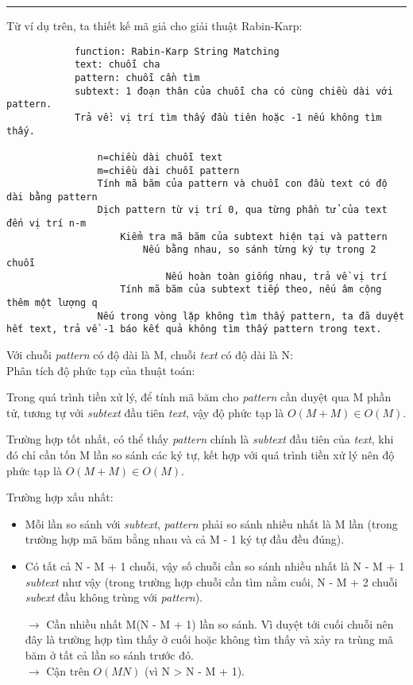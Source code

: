 \documentclass[a4paper,11pt]{article}
\begin{document}
\begin{enumerate}
		\vspace*{2mm}
		\hrule
		\vspace*{4mm}
		Từ ví dụ trên, ta thiết kế mã giả cho giải thuật Rabin-Karp:

			\begin{lstlisting}
			function: Rabin-Karp String Matching
			text: chuỗi cha 
			pattern: chuỗi cần tìm 
			subtext: 1 đoạn thân của chuỗi cha có cùng chiều dài với pattern.
			Trả về: vị trí tìm thấy đầu tiên hoặc -1 nếu không tìm thấy.
			
				n=chiều dài chuỗi text
				m=chiều dài chuỗi pattern
				Tính mã băm của pattern và chuỗi con đầu text có độ dài bằng pattern
				Dịch pattern từ vị trí 0, qua từng phần tử của text đến vị trí n-m
					Kiểm tra mã băm của subtext hiện tại và pattern
						Nếu bằng nhau, so sánh từng ký tự trong 2 chuỗi
							Nếu hoàn toàn giống nhau, trả về vị trí
					Tính mã băm của subtext tiếp theo, nếu âm cộng thêm một lượng q
				Nếu trong vòng lặp không tìm thấy pattern, ta đã duyệt hết text, trả về -1 báo kết quả không tìm thấy pattern trong text.
			\end{lstlisting}

			Với chuỗi \textit{pattern} có độ dài là M, chuỗi \textit{text} có độ dài là N: \\
			Phân tích độ phức tạp của thuật toán:

				Trong quá trình tiền xử lý, để tính mã băm cho \textit{pattern} cần duyệt qua M phần tử, tương tự với \textit{subtext} đầu tiên \textit{text}, vậy độ phức tạp là $O(M+M) \in O(M)$.

				Trường hợp tốt nhất, có thể thấy \textit{pattern} chính là \textit{subtext} đầu tiên của \textit{text}, khi đó chỉ cần tốn M lần so sánh các ký tự, kết hợp với quá trình tiền xử lý nên độ phức tạp là $O(M+M) \in O(M)$.

				Trường hợp xấu nhất:
			\begin{itemize}
				\item Mỗi lần so sánh với \textit{subtext}, \textit{pattern} phải so sánh nhiều nhất là M lần (trong trường hợp mã băm bằng nhau và cả M - 1 ký tự đầu đều đúng).
				\item Có tất cả N - M + 1 chuỗi, vậy số chuỗi cần so sánh nhiều nhất là N - M + 1 \textit{subtext} như vậy (trong trường hợp chuỗi cần tìm nằm cuối, N - M + 2 chuỗi \textit{subext} đầu không trùng với \textit{pattern}).
				
				$\to$ Cần nhiều nhất M(N - M + 1) lần so sánh. Vì duyệt tới cuối chuỗi nên đây là trường hợp tìm thấy ở cuối hoặc không tìm thấy và xảy ra trùng mã băm ở tất cả lần so sánh trước đó.\\
				$\to$ Cận trên $O(MN)$ (vì N > N - M + 1). 
				

\end{itemize}
\end{enumerate}
\end{document}
